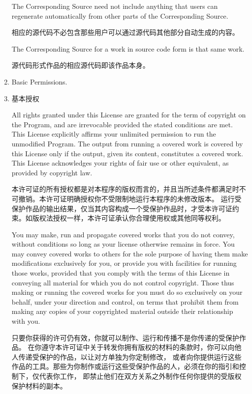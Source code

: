 \documentclass[11pt]{article}
\begin{document}
\begin{enumerate}
        The Corresponding Source need not include anything that users
        can regenerate automatically from other parts of the Corresponding
        Source.

        相应的源代码不必包含那些用户可以通过源代码其他部分自动生成的内容。


        The Corresponding Source for a work in source code form is that
        same work.

        源代码形式作品的相应源代码即该作品本身。

  \item Basic Permissions.
  \item 基本授权

        All rights granted under this License are granted for the term of
        copyright on the Program, and are irrevocable provided the stated
        conditions are met.  This License explicitly affirms your unlimited
        permission to run the unmodified Program.  The output from running a
        covered work is covered by this License only if the output, given its
        content, constitutes a covered work.  This License acknowledges your
        rights of fair use or other equivalent, as provided by copyright law.

        本许可证的所有授权都是对本程序的版权而言的，并且当所述条件都满足时不可撤销。本许可证明确授权你不受限制地运行本程序的未修改版本。
        运行受保护作品的输出结果，仅当其内容构成一个受保护作品时，才受本许可证约束。如版权法授权一样，本许可证承认你合理使用权或其他同等权利。

        You may make, run and propagate covered works that you do not
        convey, without conditions so long as your license otherwise remains
        in force.  You may convey covered works to others for the sole purpose
        of having them make modifications exclusively for you, or provide you
        with facilities for running those works, provided that you comply with
        the terms of this License in conveying all material for which you do
        not control copyright.  Those thus making or running the covered works
        for you must do so exclusively on your behalf, under your direction
        and control, on terms that prohibit them from making any copies of
        your copyrighted material outside their relationship with you.

        只要你获得的许可仍有效，你就可以制作、运行和传播不是你传递的受保护作品。
        在你遵守本许可证中关于转发你拥有版权的材料的条款时，你可以向他人传递受保护的作品，以让对方单独为你定制修改，
        或者向你提供运行这些作品的工具。那些为你制作或运行这些受保护作品的人，必须在你的指引和控制下，仅代表你工作，
        即禁止他们在双方关系之外制作任何你提供的受版权保护材料的副本。


\end{enumerate}
\end{document}
